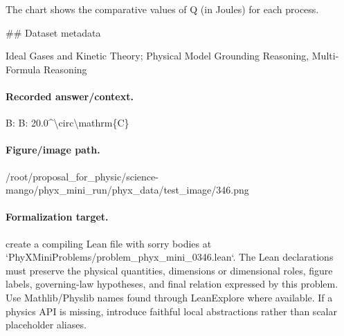 The chart shows the comparative values of Q (in Joules) for each process.

\#\# Dataset metadata

Ideal Gases and Kinetic Theory; Physical Model Grounding Reasoning, Multi-Formula Reasoning

\paragraph{Recorded answer/context.}
B: B: 20.0\textasciicircum{}\textbackslash{}circ\textbackslash{}mathrm\{C\}

\paragraph{Figure/image path.}
/root/proposal\_for\_physic/science-mango/phyx\_mini\_run/phyx\_data/test\_image/346.png

\paragraph{Formalization target.}
create a compiling Lean file with sorry bodies at `PhyXMiniProblems/problem\_phyx\_mini\_0346.lean`. The Lean declarations must preserve the physical quantities, dimensions or dimensional roles, figure labels, governing-law hypotheses, and final relation expressed by this problem.
Use Mathlib/Physlib names found through LeanExplore where available. If a physics API is missing, introduce faithful local abstractions rather than scalar placeholder aliases.

